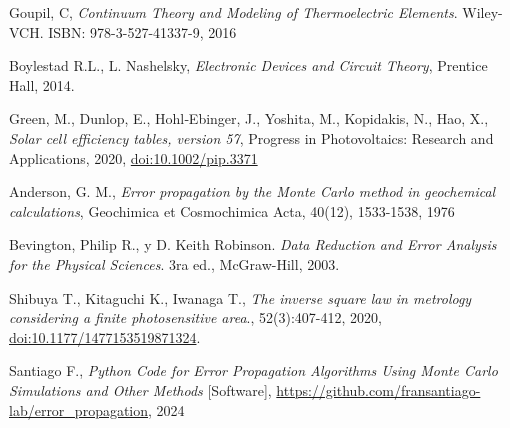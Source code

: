 \begin{thebibliography}{99}
	
	 Goupil, C, \textit{Continuum Theory and Modeling of Thermoelectric Elements}. Wiley-VCH. ISBN: 978-3-527-41337-9, 2016 
	
	 Boylestad R.L., L. Nashelsky, \textit{Electronic Devices and Circuit Theory}, Prentice Hall, 2014.
	
	 Green, M., Dunlop, E., Hohl‐Ebinger, J., Yoshita, M., Kopidakis, N., Hao, X.,  \textit{Solar cell efficiency tables, version 57},  Progress in Photovoltaics: Research and Applications, 2020, \href{https://doi.org/10.1002/pip.3371}{doi:10.1002/pip.3371}
		
	 Anderson, G. M., \textit{Error propagation by the Monte Carlo method in geochemical calculations}, Geochimica et Cosmochimica Acta, 40(12), 1533-1538, 1976
	
	 Bevington, Philip R., y D. Keith Robinson. \textit{Data Reduction and Error Analysis for the Physical Sciences}. 3ra ed., McGraw-Hill, 2003.
	
	 Shibuya T., Kitaguchi K., Iwanaga T., \textit{The inverse square law in metrology considering a finite photosensitive area}., 52(3):407-412, 2020, \href{https://doi.org/10.1177/1477153519871324}{doi:10.1177/1477153519871324}.
	
	 Santiago F., \textit{Python Code for Error Propagation Algorithms Using Monte Carlo Simulations and Other Methods} [Software], \url{https://github.com/fransantiago-lab/error_propagation}, 2024
	
	
	

	
	



	
\end{thebibliography}

    
   




